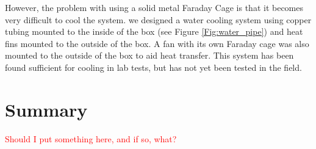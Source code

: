 However, the problem with using a solid metal Faraday Cage is that it becomes very difficult to cool the system. we designed a water cooling system using copper tubing mounted to the inside of the box (see Figure \ref{Fig:water_pipe}) and heat fins mounted to the outside of the box. A fan with its own Faraday cage was also mounted to the outside of the box to aid heat transfer. This system has been found sufficient for cooling in lab tests, but has not yet been tested in the field. 

\section{Summary}

\textcolor{red}{Should I put something here, and if so, what?}